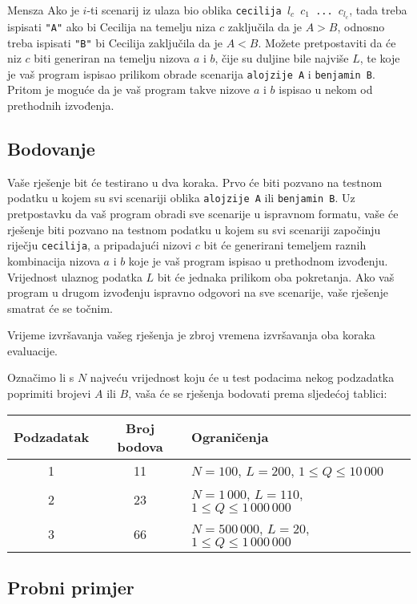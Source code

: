 \begin{statement}[
  problempoints=100,
  timelimit=1 sekunda,
  memorylimit=512 MiB,
]{Mensza}
Ako je $i$-ti scenarij iz ulaza bio oblika \texttt{cecilija $l_c$ $c_1$ ...
$c_{l_c}$}, tada treba ispisati \texttt{"A"} ako bi Cecilija na temelju niza
$c$ zaključila da je $A > B$, odnosno treba ispisati \texttt{"B"} bi Cecilija
zaključila da je $A < B$. Možete pretpostaviti da će niz $c$ biti generiran na
temelju nizova $a$ i $b$, čije su duljine bile najviše $L$, te  koje je vaš
program ispisao prilikom obrade scenarija \texttt{alojzije A} i
\texttt{benjamin B}. Pritom je moguće da je vaš program takve nizove $a$ i $b$
ispisao u nekom od prethodnih izvođenja.

\subsection*{Bodovanje}
Vaše rješenje bit će testirano u dva koraka. Prvo će biti pozvano na testnom
podatku u kojem su svi scenariji oblika \texttt{alojzije A} ili
\texttt{benjamin B}. Uz pretpostavku da vaš program obradi sve scenarije u
ispravnom formatu, vaše će rješenje biti pozvano na testnom podatku u kojem
su svi scenariji započinju riječju \texttt{cecilija}, a pripadajući nizovi $c$
bit će generirani temeljem raznih kombinacija nizova $a$ i $b$ koje je vaš
program ispisao u prethodnom izvođenju. Vrijednost ulaznog podatka $L$ bit će
jednaka prilikom oba pokretanja. Ako vaš program u drugom izvođenju ispravno
odgovori na sve scenarije, vaše rješenje smatrat će se točnim.

Vrijeme izvršavanja vašeg rješenja je zbroj vremena izvršavanja
oba koraka evaluacije.

Označimo li s $N$ najveću vrijednost koju će u test podacima nekog podzadatka
poprimiti brojevi $A$ ili $B$, vaša će se rješenja bodovati prema sljedećoj
tablici:

{\renewcommand{\arraystretch}{1.4}
  \setlength{\tabcolsep}{6pt}
  \begin{tabular}{ccl}
   Podzadatak & Broj bodova & Ograničenja \\ \midrule
    1 & 11 & $N = 100$, $L = 200$, $1 \le Q \le 10\,000$ \\
    2 & 23 & $N = 1\,000$, $L = 110$, $1 \le Q \le 1\,000\,000$ \\
    3 & 66 & $N = 500\,000$, $L = 20$, $1 \le Q \le 1\,000\,000$
\end{tabular}}

\subsection*{Probni primjer}

\end{statement}
